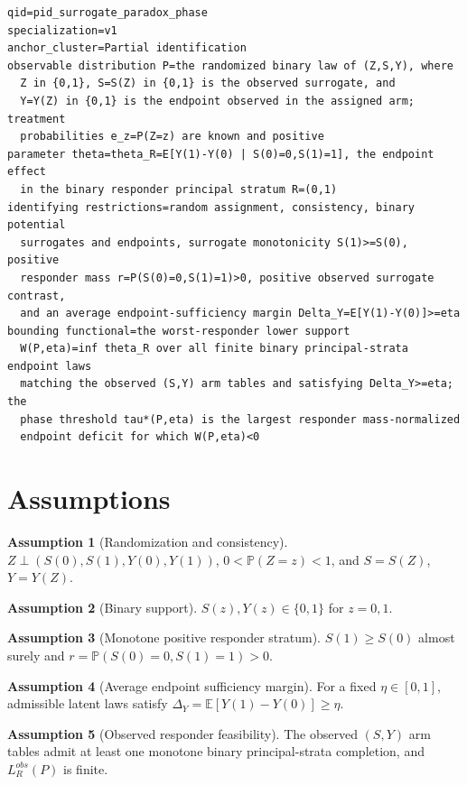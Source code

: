 \documentclass[11pt]{article}
\newcommand{\E}{\mathbb{E}}
\renewcommand{\Pr}{\mathbb{P}}
\theoremstyle{definition}
\newtheorem{assumption}{Assumption}
\theoremstyle{plain}
\theoremstyle{remark}
\begin{document}
\begin{verbatim}
qid=pid_surrogate_paradox_phase
specialization=v1
anchor_cluster=Partial identification
observable distribution P=the randomized binary law of (Z,S,Y), where
  Z in {0,1}, S=S(Z) in {0,1} is the observed surrogate, and
  Y=Y(Z) in {0,1} is the endpoint observed in the assigned arm; treatment
  probabilities e_z=P(Z=z) are known and positive
parameter theta=theta_R=E[Y(1)-Y(0) | S(0)=0,S(1)=1], the endpoint effect
  in the binary responder principal stratum R=(0,1)
identifying restrictions=random assignment, consistency, binary potential
  surrogates and endpoints, surrogate monotonicity S(1)>=S(0), positive
  responder mass r=P(S(0)=0,S(1)=1)>0, positive observed surrogate contrast,
  and an average endpoint-sufficiency margin Delta_Y=E[Y(1)-Y(0)]>=eta
bounding functional=the worst-responder lower support
  W(P,eta)=inf theta_R over all finite binary principal-strata endpoint laws
  matching the observed (S,Y) arm tables and satisfying Delta_Y>=eta; the
  phase threshold tau*(P,eta) is the largest responder mass-normalized
  endpoint deficit for which W(P,eta)<0
\end{verbatim}

\section{Assumptions}
\begin{assumption}[Randomization and consistency]\label{ass:random-consistency}
\(Z\perp(S(0),S(1),Y(0),Y(1))\), \(0<\Pr(Z=z)<1\), and \(S=S(Z)\), \(Y=Y(Z)\).
\end{assumption}

\begin{assumption}[Binary support]\label{ass:binary-support}
\(S(z),Y(z)\in\{0,1\}\) for \(z=0,1\).
\end{assumption}

\begin{assumption}[Monotone positive responder stratum]\label{ass:monotone-responder}
\(S(1)\ge S(0)\) almost surely and \(r=\Pr(S(0)=0,S(1)=1)>0\).
\end{assumption}

\begin{assumption}[Average endpoint sufficiency margin]\label{ass:average-sufficiency}
For a fixed \(\eta\in[0,1]\), admissible latent laws satisfy \(\Delta_Y=\E[Y(1)-Y(0)]\ge\eta\).
\end{assumption}

\begin{assumption}[Observed responder feasibility]\label{ass:observed-feasibility}
The observed \((S,Y)\) arm tables admit at least one monotone binary principal-strata completion, and \(L_R^{obs}(P)\) is finite.
\end{assumption}
\end{document}
